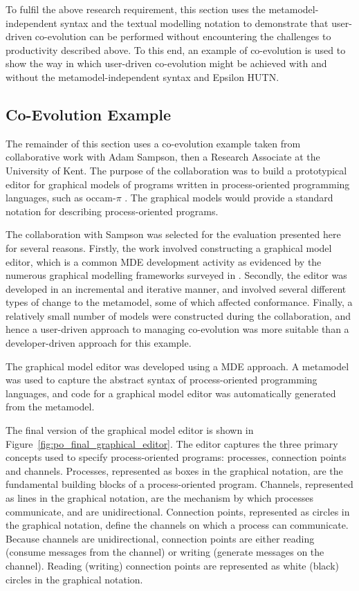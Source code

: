 To fulfil the above research requirement, this section uses the metamodel-independent syntax and the textual modelling notation to demonstrate that user-driven co-evolution can be performed without encountering the challenges to productivity described above. To this end, an example of co-evolution is used to show the way in which user-driven co-evolution might be achieved with and without the metamodel-independent syntax and Epsilon HUTN.

\subsection{Co-Evolution Example}
\label{subsec:user-driven_co-evolution_example}
The remainder of this section uses a co-evolution example taken from collaborative work with Adam Sampson, then a Research Associate at the University of Kent. The purpose of the collaboration was to build a prototypical editor for graphical models of programs written in process-oriented programming languages, such as occam-$\pi$ \cite{occam_pi}. The graphical models would provide a standard notation for describing process-oriented programs.

The collaboration with Sampson was selected for the evaluation presented here for several reasons. Firstly, the work involved constructing a graphical model editor, which is a common MDE development activity as evidenced by the numerous graphical modelling frameworks surveyed in \cite{amyot06evaluation}. Secondly, the editor was developed in an incremental and iterative manner, and involved several different types of change to the metamodel, some of which affected conformance. Finally, a relatively small number of models were constructed during the collaboration, and hence a user-driven approach to managing co-evolution was more suitable than a developer-driven approach for this example.

The graphical model editor was developed using a MDE approach. A metamodel was used to capture the abstract syntax of process-oriented programming languages, and code for a graphical model editor was automatically generated from the metamodel. 

The final version of the graphical model editor is shown in Figure~\ref{fig:po_final_graphical_editor}. The editor captures the three primary concepts used to specify process-oriented programs: processes, connection points and channels. Processes, represented as boxes in the graphical notation, are the fundamental building blocks of a process-oriented program. Channels, represented as lines in the graphical notation, are the mechanism by which processes communicate, and are unidirectional. Connection points, represented as circles in the graphical notation, define the channels on which a process can communicate. Because channels are unidirectional, connection points are either reading (consume messages from the channel) or writing (generate messages on the channel). Reading (writing) connection points are represented as white (black) circles in the graphical notation.  

